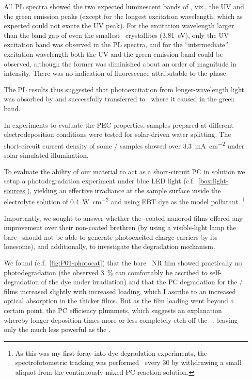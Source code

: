 \documentclass[webedition,openright,titles,swedish,english]{LuaUUThesis}\usepackage[]{graphicx}\usepackage[]{xcolor}
\newcommand{\viz}{viz.}
\newcommand{\namely}{\viz}
\newcommand{\cf}{c.f.}
\begin{document}
All \gls{PL} spectra showed the two expected luminescent bands of \ZnO, \namely,
the UV and the green emission peaks (except for the longest excitation wavelength,
which as expected could not excite the UV peak).
For the excitation wavelength larger than the band gap of even the smallest
\ZnO\ crystallites (\qty{3.81}{\eV}), only the \gls{UV} excitation band
was observed in the \gls{PL} spectra, and for the \enquote{intermediate} excitation
wavelength both the \gls{UV} and the green emission band could be observed, although
the former was diminished about an order of magnitude in intensity.
There was no indication of fluorescence attributable to the  phase.

The \gls{PL} results thus suggested that photoexcitation
from longer-wavelength light was absorbed by  and successfully
transferred to \ZnO\ where it caused  in the green band.


In experiments to evaluate the \gls{PEC} properties, samples prepared at different
electrodeposition conditions were tested for solar-driven water splitting.
The short-circuit current density of some \ZnO/ samples showed over
\qty{3.3}{\mA\per\square\cm} under solar-simulated illumination.



To evaluate the ability of our material to act as a short-circuit \gls{PC}
in solution we setup a photodegradation experiment under blue \gls{LED} light
(\cf\ \cref{box:light-sources}), yielding an effective irradiance at the
sample surface inside the electrolyte solution of \qty{0.4}{\watt\per\square\cm}
and using \gls{EBT} dye as the model pollutant.%
\footnote{%
   As this was my first foray into dye degradation experiments,
   the spectrofotometric tracking was performed \exsitu\ every
   \qty{30}{\min} by withdrawing a small aliquot from the continuously mixed
   \gls{PC} reaction solution.
}

Importantly, we sought to answer whether the -coated nanorod films
offered any improvement over their non-coated brethren
(by using a visible-light lamp the bare \ZnO\ should not be able to generate
photoexcited charge carriers by its lonesome), and additionally, to investigate
the degradation mechanism.

We found (\cf\ \cref{fig:P01-photocat}) that the bare \ZnO\ \gls{NR} film
showed practically no photodegradation (the observed \qty{3}{\percent} can comfortably
be ascribed to self-degradation of the dye under irradiation)
and that the \gls{PC} degradation for the \ZnO/ films increased
slightly with increased  loading, which I ascribe to an increased
optical absorption in the thicker films.
But as the  film loading went beyond a certain point, the \gls{PC} efficiency
plummets, which suggests an explanation whereby longer deposition times more
or less completely etch off the \ZnO\ , leaving only
the much less powerful  as the .
\end{document}
